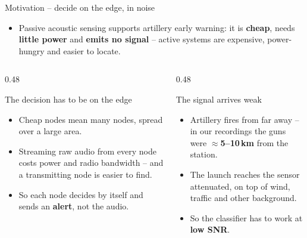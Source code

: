 \documentclass[aspectratio=169,10pt]{beamer}
\begin{document}
\begin{frame}{Motivation -- decide on the edge, in noise}
  \begin{itemize}
    \item Passive acoustic sensing supports artillery early warning: it is
          \textbf{cheap}, needs \textbf{little power} and \textbf{emits no signal} --
          active systems are expensive, power-hungry and easier to locate.
  \end{itemize}
  \vspace{1mm}
  \begin{columns}[T,onlytextwidth]
    \begin{column}{0.48\textwidth}
      \begin{block}{\faMicrochip\enspace The decision has to be on the edge}
        \small
        \begin{itemize}\small
          \item Cheap nodes mean many nodes, spread over a large area.
          \item Streaming raw audio from every node costs power and radio
                bandwidth -- and a transmitting node is easier to find.
          \item So each node decides by itself and sends an
                \textbf{alert}, not the audio.
        \end{itemize}
      \end{block}
    \end{column}
    \begin{column}{0.48\textwidth}
      \begin{block}{\faWaveSquare\enspace The signal arrives weak}
        \small
        \begin{itemize}\small
          \item Artillery fires from far away -- in our recordings the guns were
                $\approx$\textbf{5--10\,km} from the station.
          \item The launch reaches the sensor attenuated, on top of wind, traffic and
                other background.
          \item So the classifier has to work at \textbf{low SNR}.
        \end{itemize}
      \end{block}
    \end{column}
  \end{columns}
\end{frame}
\end{document}
